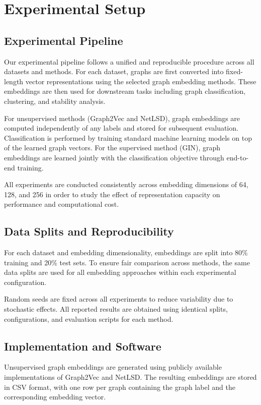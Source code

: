 \section{Experimental Setup}

\subsection{Experimental Pipeline}
Our experimental pipeline follows a unified and reproducible procedure across all datasets and methods.
For each dataset, graphs are first converted into fixed-length vector representations using the selected
graph embedding methods. These embeddings are then used for downstream tasks including graph classification,
clustering, and stability analysis.

For unsupervised methods (Graph2Vec and NetLSD), graph embeddings are computed independently of any labels
and stored for subsequent evaluation. Classification is performed by training standard machine learning
models on top of the learned graph vectors.
For the supervised method (GIN), graph embeddings are learned jointly with the classification objective
through end-to-end training.

All experiments are conducted consistently across embedding dimensions of 64, 128, and 256 in order to
study the effect of representation capacity on performance and computational cost.

\subsection{Data Splits and Reproducibility}
For each dataset and embedding dimensionality, embeddings are split into 80\% training and 20\% test sets.
To ensure fair comparison across methods, the same data splits are used for all embedding approaches
within each experimental configuration.

Random seeds are fixed across all experiments to reduce variability due to stochastic effects.
All reported results are obtained using identical splits, configurations, and evaluation scripts
for each method.

\subsection{Implementation and Software}
Unsupervised graph embeddings are generated using publicly available implementations of Graph2Vec
and NetLSD. The resulting embeddings are stored in CSV format, with one row per graph containing
the graph label and the corresponding embedding vector.

